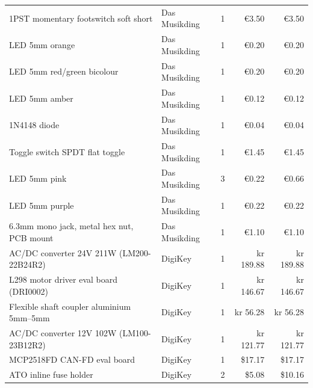 \begin{longtable}{p{7cm} l r r r}
	1PST momentary footswitch soft short               & Das Musikding     & 1            & €3.50               & €3.50          \\
	LED 5mm orange                                     & Das Musikding     & 1            & €0.20               & €0.20          \\
	LED 5mm red/green bicolour                         & Das Musikding     & 1            & €0.20               & €0.20          \\
	LED 5mm amber                                      & Das Musikding     & 1            & €0.12               & €0.12          \\
	1N4148 diode                                       & Das Musikding     & 1            & €0.04               & €0.04          \\
	Toggle switch SPDT flat toggle                     & Das Musikding     & 1            & €1.45               & €1.45          \\
	LED 5mm pink                                       & Das Musikding     & 3            & €0.22               & €0.66          \\
	LED 5mm purple                                     & Das Musikding     & 1            & €0.22               & €0.22          \\
	6.3mm mono jack, metal hex nut, PCB mount          & Das Musikding     & 1            & €1.10               & €1.10          \\
	AC/DC converter 24V 211W (LM200-22B24R2)           & DigiKey           & 1            & kr 189.88           & kr 189.88      \\
	L298 motor driver eval board (DRI0002)             & DigiKey           & 1            & kr 146.67           & kr 146.67      \\
	Flexible shaft coupler aluminium 5mm--5mm          & DigiKey           & 1            & kr 56.28            & kr 56.28       \\
	AC/DC converter 12V 102W (LM100-23B12R2)           & DigiKey           & 1            & kr 121.77           & kr 121.77      \\
	MCP2518FD CAN-FD eval board                        & DigiKey           & 1            & \$17.17             & \$17.17        \\
	ATO inline fuse holder                             & DigiKey           & 2            & \$5.08              & \$10.16        \\

\end{longtable}
